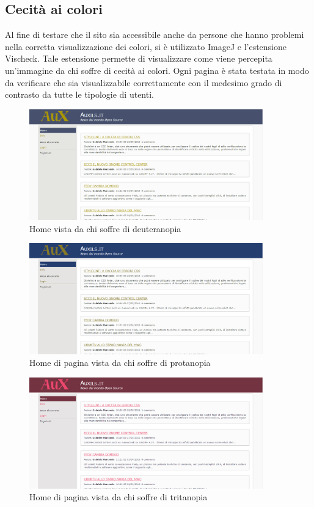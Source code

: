 \subsection{Cecità ai colori}
Al fine di testare che il sito sia accessibile anche da persone che hanno problemi nella corretta visualizzazione dei colori, si è utilizzato ImageJ e l'estensione Vischeck.
Tale estensione permette di visualizzare come viene percepita un'immagine da chi soffre di cecità ai colori. Ogni pagina è stata testata in modo da verificare che sia visualizzabile correttamente con il medesimo grado di contrasto da tutte le tipologie di utenti.

\begin{figure}[H]
		\centering \includegraphics[width=0.9\textwidth]{images/deute.png}
		\caption{Home vista da chi soffre di deuteranopia}
\end{figure}
	
\begin{figure}[H]
		\centering \includegraphics[width=0.9\textwidth]{images/proto.png}
		\caption{Home di pagina vista da chi soffre di protanopia}
\end{figure}
	
\begin{figure}[H]
		\centering \includegraphics[width=0.9\textwidth]{images/trita.png}
		\caption{Home di pagina vista da chi soffre di tritanopia}
\end{figure}

